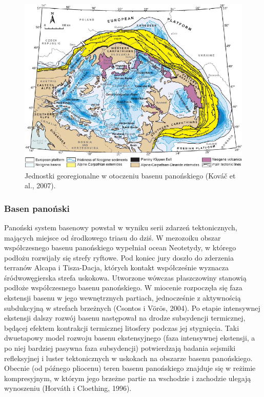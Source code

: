 \documentclass[11.5pt,twoside]{report}
\begin{document}
\begin{figure}[h]
	\centering
	\includegraphics[scale=0.7]{"../Termika/kovac et al"}
	\caption{Jednostki georegionalne w otoczeniu basenu panońskiego (Kováč et al., 2007).}
	\label{Fig.}
\end{figure}

\subsubsection{Basen panoński}

Panoński system basenowy powstał w wyniku serii zdarzeń tektonicznych, mających miejsce od środkowego triasu do dziś. W mezozoiku obszar współczesnego basenu panońskiego wypełniał ocean Neotetydy, w którego podłożu rozwijały się strefy ryftowe. Pod koniec jury doszło do zderzenia terranów Alcapa i Tisza-Dacja, których kontakt współcześnie wyznacza śródwowęgierska strefa uskokowa. Utworzone wówczas płaszczowiny stanowią podłoże współczesnego basenu panońskiego. W miocenie rozpoczęła się faza ekstensji basenu w jego wewnętrznych partiach, jednocześnie z aktywnością subdukcyjną w strefach brzeżnych (Csontos i V\"{o}r\"{o}s, 2004). Po etapie intensywnej ekstensji dalszy rozwój basenu następował na drodze subsydencji termicznej, będącej efektem kontrakcji termicznej litosfery podczas jej stygnięcia. Taki dwuetapowy model rozwoju basenu ekstensyjnego (faza intensywnej ekstensji, a po niej bardziej pasywna faza subsydencji) potwierdzają badania sejsmiki refleksyjnej i luster tektonicznych w uskokach na obszarze basenu panońskiego. Obecnie (od pó\'{z}nego pliocenu) teren basenu panońskiego znajduje się w reżimie kompresyjnym, w którym jego brzeżne partie na wschodzie i zachodzie ulegają wynoszeniu (Horv\'{a}th i Cloething, 1996). 
\end{document}
